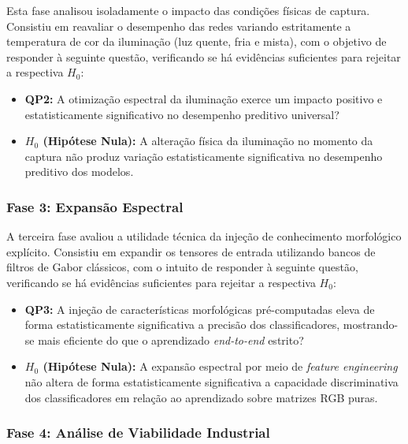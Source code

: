         Esta fase analisou isoladamente o impacto das condições físicas de captura. Consistiu em reavaliar o desempenho das redes variando estritamente a temperatura de cor da iluminação (luz quente, fria e mista), com o objetivo de responder à seguinte questão, verificando se há evidências suficientes para rejeitar a respectiva $H_{0}$:

        \begin{itemize}
            \item\textbf{QP2:} A otimização espectral da iluminação exerce um impacto positivo e estatisticamente significativo no desempenho preditivo universal?
            \item\textbf{$H_{0}$ (Hipótese Nula):} A alteração física da iluminação no momento da captura não produz variação estatisticamente significativa no desempenho preditivo dos modelos.
        \end{itemize}

    \subsubsection{Fase 3: Expansão Espectral}

        A terceira fase avaliou a utilidade técnica da injeção de conhecimento morfológico explícito. Consistiu em expandir os tensores de entrada utilizando bancos de filtros de Gabor clássicos, com o intuito de responder à seguinte questão, verificando se há evidências suficientes para rejeitar a respectiva $H_{0}$:

        \begin{itemize}
            \item\textbf{QP3:} A injeção de características morfológicas pré-computadas eleva de forma estatisticamente significativa a precisão dos classificadores, mostrando-se mais eficiente do que o aprendizado \textit{end-to-end} estrito?
            \item\textbf{$H_{0}$ (Hipótese Nula):} A expansão espectral por meio de \textit{feature engineering} não altera de forma estatisticamente significativa a capacidade discriminativa dos classificadores em relação ao aprendizado sobre matrizes RGB puras.
        \end{itemize}

    \subsubsection{Fase 4: Análise de Viabilidade Industrial}


